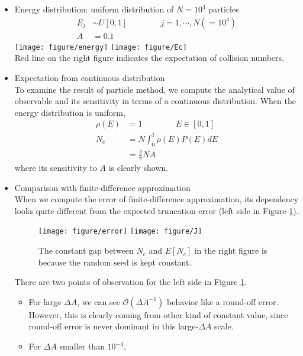 \documentclass[11pt]{article}
\begin{document}
\begin{itemize}
\item Energy distribution: uniform distribution of $N=10^4$ particles
\begin{equation*}
\begin{split}
E_j &\sim U[0,1]\qquad\qquad j=1,\cdots,N(=10^4)\\
A &= 0.1
\end{split}
\end{equation*}
\texttt{[image: figure/energy]}
\texttt{[image: figure/Ec]}\\
Red line on the right figure indicates the expectation of collision numbers.
\item Expectation from continuous distribution\\
To examine the result of particle method,
we compute the analytical value of observable and its sensitivity in terms of a continuous distribution.
When the energy distribution is uniform,
\begin{equation}
\begin{split}
\rho(E) &= 1\qquad\qquad E\in[0,1]\\
N_c &= N\int_0^1 \rho(E)P(E) dE\\
&= \frac{2}{\pi}NA
\label{e4}
\end{split}
\end{equation}
where its sensitivity to $A$ is clearly shown.
\item Comparison with finite-difference approximation\\
When we compute the error of finite-difference approximation,
its dependency looks quite different from the expected truncation error (left side in Figure \ref{f1}).\\
\begin{figure}[h]
\texttt{[image: figure/error]}
\texttt{[image: figure/J]}
\caption{The constant gap between $N_c$ and $E[N_c]$ in the right figure
is because the random seed is kept constant.}
\label{f1}
\end{figure}
There are two points of observation for the left side in Figure \ref{f1}.
\begin{itemize}
\item For large $\Delta A$, we can see $\mathcal{O}(\Delta A^{-1})$ behavior like a round-off error.
However, this is clearly coming from other kind of constant value,
since round-off error is never dominant in this large-$\Delta A$ scale.
\item For $\Delta A$ smaller than $10^{-4}$,

\end{itemize}
\end{itemize}
\end{document}
